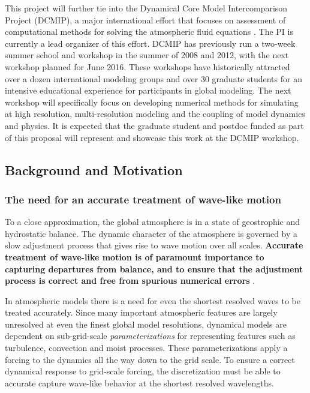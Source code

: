 \documentclass[11pt]{article}
\begin{document}
This project will further tie into the Dynamical Core Model Intercomparison Project (DCMIP), a major international effort that focuses on assessment of computational methods for solving the atmospheric fluid equations \cite{DCMIP2012TESTCASES,kent2013dynamical}.  The PI is currently a lead organizer of this effort.  DCMIP has previously run a two-week summer school and workshop in the summer of 2008 and 2012, with the next workshop planned for June 2016.  These workshops have historically attracted over a dozen international modeling groups and over 30 graduate students for an intensive educational experience for participants in global modeling.  The next workshop will specifically focus on developing numerical methods for simulating at high resolution, multi-resolution modeling and the coupling of model dynamics and physics.  It is expected that the graduate student and postdoc funded as part of this proposal will represent and showcase this work at the DCMIP workshop.

\subsection{Background and Motivation} \label{sec:BackgroundMotivation}

\subsubsection{The need for an accurate treatment of wave-like motion} \label{sec:Waves}

To a close approximation, the global atmosphere is in a state of geostrophic and hydrostatic balance.  The dynamic character of the atmosphere is governed by a slow adjustment process that gives rise to wave motion over all scales.  \textbf{Accurate treatment of wave-like motion is of paramount importance to capturing departures from balance, and to ensure that the adjustment process is correct and free from spurious numerical errors} \cite{randall1994geostrophic, thuburn2005vertical}.

In atmospheric models there is a need for even the shortest resolved waves to be treated accurately.  Since many important atmospheric features are largely unresolved at even the finest global model resolutions, dynamical models are dependent on sub-grid-scale \textit{parameterizations} for representing features such as turbulence, convection and moist processes.  These parameterizations apply a forcing to the dynamics all the way down to the grid scale.  To ensure a correct dynamical response to grid-scale forcing, the discretization must be able to accurate capture wave-like behavior at the shortest resolved wavelengths.
\end{document}
